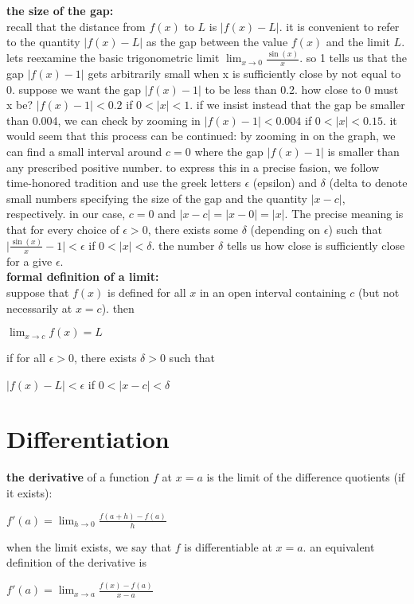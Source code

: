 \documentclass{article}
\begin{document}
\textbf{the size of the gap:}\\
recall that the distance from $f(x)$ to $L$ is $\lvert f(x) - L\rvert$. it is convenient to refer to the quantity $\lvert f(x) - L\rvert$ as the gap between the value $f(x)$ and the limit $L$. lets reexamine the basic trigonometric limit $\lim_{x \to 0}\frac{\sin(x)}{x}$. so 1 tells us that the gap $\lvert f(x) - 1\rvert$ gets arbitrarily small when x is sufficiently close by not equal to 0. suppose we want the gap $\lvert f(x) - 1\rvert$ to be less than 0.2. how close to 0 must x be? $\lvert f(x) - 1\rvert < 0.2$ if $0 < \lvert x\rvert < 1$. if we insist instead that the gap be smaller than 0.004, we can check by zooming in $\lvert f(x) - 1\rvert < 0.004$ if $0 < \lvert x\rvert < 0.15$. it would seem that this process can be continued: by zooming in on the graph, we can find a small interval around $c = 0$ where the gap $\lvert f(x) - 1\rvert$ is smaller than any prescribed positive number. to express this in a precise fasion, we follow time-honored tradition and use the greek letters $\epsilon$ (epsilon) and $\delta$ (delta to denote small numbers specifying the size of the gap and the quantity $\lvert x - c\rvert$, respectively. in our case, $c = 0$ and $\lvert x - c\rvert = \lvert x - 0\rvert = \lvert x\rvert$. The precise meaning is that for every choice of $\epsilon > 0$, there exists some $\delta$ (depending on $\epsilon$) such that $\lvert \frac{\sin(x)}{x} - 1\rvert < \epsilon$ if $0 < \lvert x\rvert < \delta$. the number $\delta$ tells us how close is sufficiently close for a give $\epsilon$.\\

\textbf{formal definition of a limit:}\\
suppose that $f(x)$ is defined for all $x$ in an open interval containing $c$ (but not necessarily at $x = c$). then
\begin{center}$\lim_{x \to c}f(x) = L$\end{center}
if for all $\epsilon > 0$, there exists $\delta > 0$ such that
\begin{center}$\lvert f(x) - L\rvert < \epsilon$ if $0 < \lvert x - c\rvert < \delta$\end{center}

\section*{Differentiation}

\textbf{the derivative} of a function $f$ at $x = a$ is the limit of the difference quotients (if it exists):
\begin{center} $f'(a) = \lim_{h \to 0}\frac{f(a + h) - f(a)}{h}$ \end{center}
when the limit exists, we say that $f$ is differentiable at $x = a$. an equivalent definition of the derivative is
\begin{center} $f'(a) = \lim_{x \to a}\frac{f(x) - f(a)}{x - a}$ \end{center}
\end{document}

